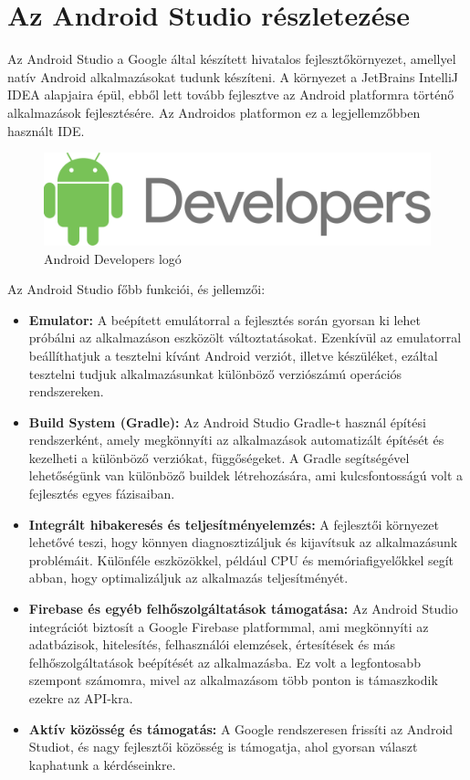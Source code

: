 \section{Az Android Studio részletezése}

Az Android Studio a Google által készített hivatalos fejlesztőkörnyezet, amellyel natív 
Android alkalmazásokat tudunk készíteni.
A környezet a JetBrains IntelliJ IDEA\cite{Jetbrains} alapjaira épül, ebből lett tovább fejlesztve az Android platformra történő alkalmazások fejlesztésére.
Az Androidos platformon ez a legjellemzőbben használt IDE.


\begin{figure}[h]
\centering
\includegraphics[scale=0.08]{images/androiddev.png}
\caption{Android Developers logó}
\label{fig:androiddevelopers}
\end{figure}

Az Android Studio főbb funkciói, és jellemzői:
\begin{itemize}
    \item \textbf{Emulator:} A beépített emulátorral\cite{Emulator} a fejlesztés során gyorsan ki lehet próbálni az alkalmazáson eszközölt változtatásokat. Ezenkívül az emulatorral beállíthatjuk
    a tesztelni kívánt Android verziót, illetve készüléket, ezáltal tesztelni tudjuk alkalmazásunkat
    különböző verziószámú operációs rendszereken.
    \item \textbf{Build System (Gradle):} Az Android Studio Gradle-t\cite{Gradle} használ építési 
    rendszerként, amely megkönnyíti az alkalmazások automatizált építését és kezelheti a 
    különböző verziókat, függőségeket. A Gradle segítségével lehetőségünk van különböző
    buildek létrehozására, ami kulcsfontosságú volt a fejlesztés egyes fázisaiban.
    \item \textbf{Integrált hibakeresés és teljesítményelemzés:} A fejlesztői környezet lehetővé teszi, hogy könnyen diagnosztizáljuk és kijavítsuk az alkalmazásunk problémáit.
    Különféle eszközökkel, például CPU és memóriafigyelőkkel segít abban, hogy optimalizáljuk az alkalmazás teljesítményét.
    \item \textbf{Firebase és egyéb felhőszolgáltatások támogatása:} 
    Az Android Studio integrációt biztosít a Google Firebase platformmal\cite{Firebase}, ami megkönnyíti az
    adatbázisok, hitelesítés, felhasználói elemzések, értesítések és más felhőszolgáltatások 
    beépítését az alkalmazásba. Ez volt a legfontosabb szempont számomra, mivel az alkalmazásom több ponton is támaszkodik ezekre az API-kra.
    \item \textbf{Aktív közösség és támogatás:} A Google rendszeresen frissíti az Android Studiot, és nagy fejlesztői közösség\cite{AndroidDevGroup} is támogatja, ahol gyorsan választ kaphatunk a kérdéseinkre.
\end{itemize}

